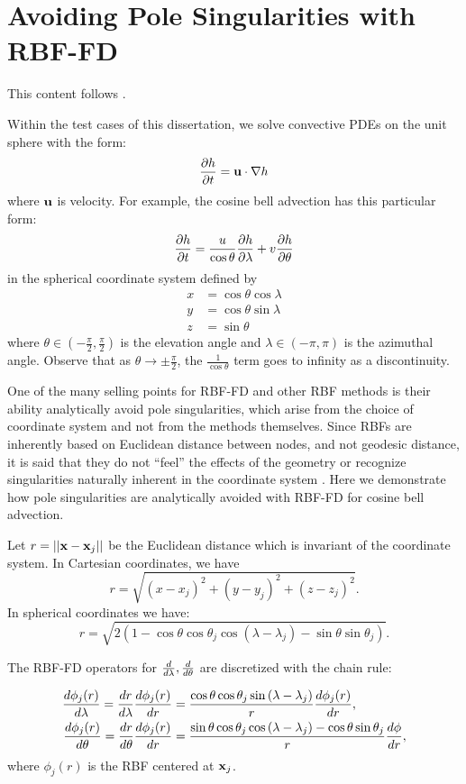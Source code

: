 \documentclass{report}
\begin{document}
\fi

\chapter{Avoiding Pole Singularities with RBF-FD}
This content follows \cite{FlyerWright07,FlyerWright09}. 

Within the test cases of this dissertation, we solve convective PDEs on the unit sphere with the form: 
$$
\frac{\partial h}{\partial t} = \mathbf{u} \cdot \nabla h
$$
where $\mathbf{u}$ is velocity. For example, the cosine bell advection has this particular form:
\begin{equation}
\frac{\partial h}{\partial t} = \frac{u}{\cos{\theta}} \frac{\partial h}{\partial \lambda} + v \frac{\partial h}{\partial \theta} \label{eq:cosine_bell_appendix}
\end{equation}
in the spherical coordinate system defined by
\begin{align*}
x & = \cos{\theta}\cos{\lambda} \\
y & = \cos{\theta}\sin{\lambda} \\
z & = \sin{\theta}
\end{align*}
where $\theta \in (-\frac{\pi}{2}, \frac{\pi}{2})$ is the elevation angle and $\lambda \in (-\pi,\pi)$ is the azimuthal angle.
Observe that as $\theta \rightarrow \pm \frac{\pi}{2}$, the $\frac{1}{\cos{\theta}}$ term goes to infinity as a discontinuity. 

One of the many selling points for RBF-FD and other RBF methods is their ability analytically avoid pole singularities, which arise from the choice of coordinate system and not from the methods themselves. Since RBFs are inherently based on Euclidean distance between nodes, and not geodesic distance, it is said that they do not ``feel'' the effects of the geometry or recognize singularities naturally inherent in the coordinate system \cite{FlyerWright07}. 
Here we demonstrate how pole singularities are analytically avoided with RBF-FD for cosine bell advection.  


Let $r = || \mathbf{x} - \mathbf{x}_j ||$ be the Euclidean distance which is invariant of the coordinate system. In Cartesian coordinates, we have
$$
r = \sqrt{(x-x_j)^2 + (y-y_j)^2 + (z-z_j)^2}.
$$
In spherical coordinates we have:
$$
r = \sqrt{2(1-\cos{\theta}\cos{\theta_j}\cos{(\lambda-\lambda_j)} - \sin{\theta}\sin{\theta_j})}.
$$

The RBF-FD operators for $\frac{d }{d \lambda}, \frac{d }{d \theta}$ are discretized with the chain rule: 

\begin{align}
\frac{d \phi_{j}(r)}{d \lambda} = \frac{d r}{d \lambda} \frac{d \phi_{j}(r)}{d r} & = \frac{\cos{\theta}\cos{\theta_j}\sin{(\lambda - \lambda_j)}}{r} \frac{d \phi_j(r)}{d r}, \label{eq:rbfffd_d_dlambda} \\
\frac{d \phi_{j}(r)}{d \theta} = \frac{d r}{d \theta} \frac{d \phi_{j}(r)}{d r} & = \frac{\sin{\theta}\cos{\theta_j}\cos{(\lambda-\lambda_j)} - \cos{\theta}\sin{\theta_j}}{r} \frac{d \phi}{d r}, \label{eq:rbfffd_d_dtheta}
\end{align}
where $\phi_{j}(r)$ is the RBF centered at $\mathbf{x}_{j}$. 
\end{document}
